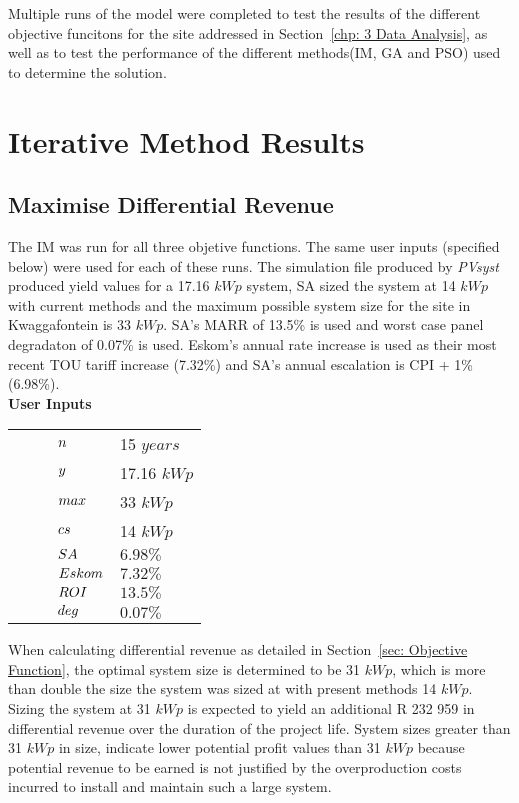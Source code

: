 \documentclass[a4paper,11pt,fleqn]{report}
\begin{document}
Multiple runs of the model were completed to test the results of the different objective funcitons for the site addressed in Section~\ref{chp: 3 Data Analysis}, as well as to test the performance of the different methods(\ac{IM}, \ac{GA} and \ac{PSO}) used to determine the solution.

\section{Iterative Method Results}
\subsection{Maximise Differential Revenue}
The \ac{IM} was run for all three objetive functions. The same user inputs (specified below) were used for each of these runs. The simulation file produced by \textit{PVsyst} produced yield values for a 17.16 $kWp$ system, \ac{SA} sized the system at 14 $kWp$ with current methods and the maximum possible system size for the site in Kwaggafontein is 33 $kWp$. \ac{SA}'s \ac{MARR} of 13.5\% is used and worst case panel degradaton of 0.07\% is used. Eskom's annual rate increase is used as their most recent \ac{TOU} tariff increase (7.32\%) and \ac{SA}'s annual escalation is \ac{CPI} + 1\% (6.98\%).\\

\textbf{User Inputs}
\newenvironment{conditions}
  {\par\vspace{\abovedisplayskip}\noindent\begin{tabular}{>{$}l<{$} @{${}={}$} l}}
  {\end{tabular}\par\vspace{\belowdisplayskip}}
\begin{conditions}
\indent\indent n & 15 $years$\\ 
\indent\indent y & 17.16 $kWp$\\
\indent\indent max & 33 $kWp$\\
\indent\indent cs & 14 $kWp$\\
\indent\indent SA & $6.98 \%$\\
\indent\indent Eskom & $7.32 \%$\\
\indent\indent ROI & $13.5 \%$\\
\indent\indent deg & $0.07 \%$
\end{conditions}

When calculating differential revenue as detailed in Section~\ref{sec: Objective Function}, the optimal system size is determined to be 31 $kWp$, which is more than double the size the system was sized at with present methods 14 $kWp$. Sizing the system at 31 $kWp$ is expected to yield an additional R 232 959 in differential revenue over the duration of the project life. System sizes greater than 31 $kWp$ in size, indicate lower potential profit values than 31 $kWp$ because potential revenue to be earned is not justified by the overproduction costs incurred to install and maintain such a large system.
\end{document}
